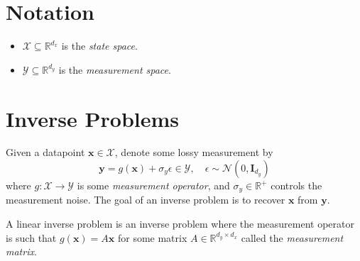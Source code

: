 
\section{Notation}\label{sec:notation}

\begin{itemize}
    \item $\mathcal{X} \subseteq \mathbb{R}^{d_x}$ is the \emph{state space}.
    \item $\mathcal{Y} \subseteq \mathbb{R}^{d_y}$ is the \emph{measurement space}.
\end{itemize}

\section{Inverse Problems}\label{sec:inverse-problems}

\begin{definition}\label{defn:inverse-problem}
    Given  a datapoint $\mathbf{x} \in \mathcal{X}$,
    denote some lossy measurement by
    \begin{equation}
        \mathbf{y} = g(\mathbf{x}) + \sigma_y\epsilon \in \mathcal{Y},\quad \epsilon \sim \mathcal{N}\left(0, \mathbf{I}_{d_y}\right) \label{eq:inverse-problem}
    \end{equation}
    where $g: \mathcal{X} \to \mathcal{Y}$ is some \emph{measurement operator},
    and $\sigma_y \in \mathbb{R}^+$ controls the measurement noise. The goal of an inverse problem
    is to recover $\mathbf{x}$ from $\mathbf{y}$.
\end{definition}

\begin{definition}\label{defn:linear-inverse-problem}
    A linear inverse problem is an inverse problem where the measurement operator is such that
    $g(\mathbf{x}) = A\mathbf{x}$ for some matrix $A \in \mathbb{R}^{d_y \times d_x}$ called the
    \emph{measurement matrix}.
\end{definition}

